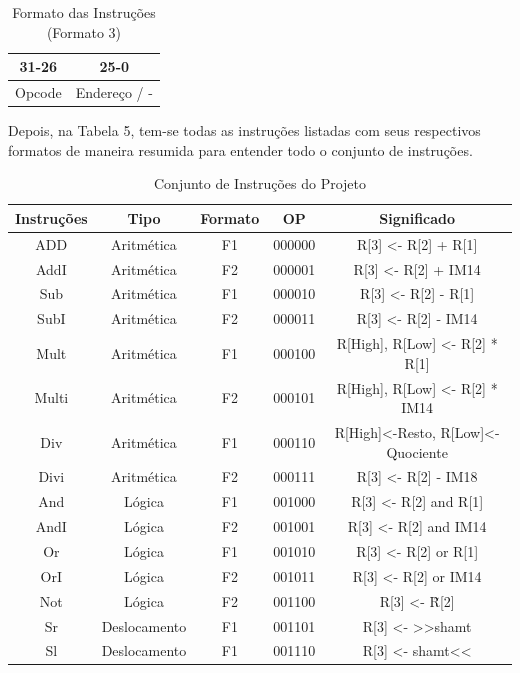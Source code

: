 \documentclass[
	12pt,				%
	openright,			%
	a4paper,			%
	english,			%
	french,				%
	spanish,			%
	brazil,				%
	]{abntex2}
\begin{document}
\begin{table}
\centering
\caption{Formato das Instruções (Formato 3)}
    \begin{tabular}{|c|c|}
     \hline
        31-26 & 25-0 \\
        \hline \hline
        Opcode & Endereço / - \\
     \hline
    \end{tabular}
\end{table}

Depois, na Tabela 5, tem-se todas as instruções listadas com seus respectivos formatos de maneira resumida para entender todo o conjunto de instruções.

\begin{table}
\centering
\caption{Conjunto de Instruções do Projeto}
    \begin{tabular}{|c|c|c|c|c|}
     \hline
        Instruções & Tipo & Formato & OP & Significado \\
        \hline \hline
        ADD & Aritmética & F1 & 000000 & R[3] <- R[2] + R[1] \\
        AddI & Aritmética & F2 & 000001	& R[3] <- R[2] + IM14 \\
        Sub & Aritmética & F1 & 000010 & R[3] <- R[2] - R[1] \\
        SubI & Aritmética & F2 & 000011 & R[3] <- R[2] - IM14 \\
        Mult & Aritmética & F1 & 000100 & R[High], R[Low] <- R[2] * R[1] \\
        Multi & Aritmética & F2 & 000101 & R[High], R[Low] <- R[2] * IM14 \\
        Div & Aritmética & F1 & 000110 & R[High]<-Resto, R[Low]<-Quociente \\
        Divi & Aritmética & F2 & 000111 & R[3] <- R[2] - IM18 \\
        And & Lógica & F1 & 001000 & R[3] <- R[2] and R[1] \\
        AndI & Lógica & F2 & 001001 & R[3] <- R[2] and IM14 \\
        Or & Lógica & F1 & 001010 & R[3] <- R[2] or R[1] \\
        OrI & Lógica & F2 & 001011 & R[3] <- R[2] or IM14 \\
        Not & Lógica & F2 & 001100 & R[3] <- \~ R[2]\\
        Sr & Deslocamento & F1 & 001101 & R[3] <- >>shamt \\
        Sl & Deslocamento & F1 & 001110 & R[3] <- shamt<< \\

\end{tabular}
\end{table}
\end{document}
